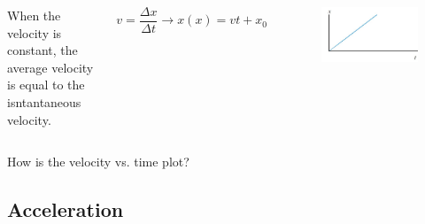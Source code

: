 \documentclass[]{beamer}
\begin{document}
\begin{frame}

   \begin{columns}[c]
   \column{2in}  %
  

When the velocity is constant, the average velocity is equal to the isntantaneous velocity.

\begin{equation}
v=\frac{\Delta x}{\Delta t}\rightarrow x(x)=vt+x_0
\end{equation}


   \column{2.5in}
   
   \begin{figure}[h!]
 
  \includegraphics[width=1.\textwidth]{images/11.jpg}
  
\end{figure}

   \end{columns}





 \end{frame}







\begin{frame}

How is the velocity vs. time plot?





 \end{frame}


\subsection{Acceleration}
\end{document}
